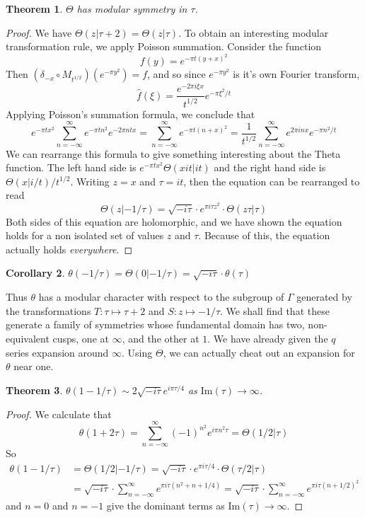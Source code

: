 \documentclass{article}
\theoremstyle{plain}
\newtheorem{theorem}{Theorem}
\newtheorem{corollary}[theorem]{Corollary}
\theoremstyle{remark}
\theoremstyle{definition}
\begin{document}
\begin{theorem}
    $\Theta$ has modular symmetry in $\tau$.
\end{theorem}
\begin{proof}
    We have $\Theta(z|\tau + 2) = \Theta(z|\tau)$. To obtain an interesting modular transformation rule, we apply Poisson summation. Consider the function
%
\[ f(y) = e^{- \pi t(y + x)^2} \]
%
Then $(\delta_{-x} \circ M_{t^{1/2}})(e^{- \pi y^2}) = f$, and so since $e^{- \pi y^2}$ is it's own Fourier transform,
%
\[ \widehat{f}(\xi) = \frac{e^{- 2 \pi i \xi x}}{t^{1/2}} e^{- \pi \xi^2/t} \]
%
Applying Poisson's summation formula, we conclude that
%
\[ e^{- \pi t x^2} \sum_{n = -\infty}^\infty e^{- \pi t n^2} e^{- 2 \pi n t x} = \sum_{n = -\infty}^\infty e^{- \pi t(n + x)^2} = \frac{1}{t^{1/2}} \sum_{n = -\infty}^\infty e^{2 \pi i n x} e^{-\pi n^2/t} \]
%
We can rearrange this formula to give something interesting about the Theta function. The left hand side is $e^{- \pi t x^2} \Theta(xit|it)$ and the right hand side is $\Theta(x|i/t)/t^{1/2}$. Writing $z = x$ and $\tau = it$, then the equation can be rearranged to read
%
\[ \Theta(z|-1/\tau) = \sqrt{-i\tau} \cdot e^{\pi i \tau z^2} \cdot \Theta(z \tau | \tau) \]
%
Both sides of this equation are holomorphic, and we have shown the equation holds for a non isolated set of values $z$ and $\tau$. Because of this, the equation actually holds {\it everywhere}.
\end{proof}

\begin{corollary} $\theta(-1/\tau) = \Theta(0|-1/\tau) = \sqrt{-i\tau} \cdot \theta(\tau)$
\end{corollary}

Thus $\theta$ has a modular character with respect to the subgroup of $\Gamma$ generated by the transformations $T: \tau \mapsto \tau + 2$ and $S: z \mapsto -1/\tau$. We shall find that these generate a family of symmetries whose fundamental domain has two, non-equivalent cusps, one at $\infty$, and the other at $1$. We have already given the $q$ series expansion around $\infty$. Using $\Theta$, we can actually cheat out an expansion for $\theta$ near one.

\begin{theorem} $\theta(1 - 1/\tau) \sim 2 \sqrt{-i\tau} e^{i \pi \tau/4}$ as $\text{Im}(\tau) \to \infty$.
\end{theorem}
\begin{proof}
We calculate that
%
\[ \theta(1 + 2 \tau) = \sum_{n = -\infty}^\infty (-1)^{n^2} e^{i \pi n^2 \tau} = \Theta(1/2|\tau) \]
%
So
%
\begin{align*}
    \theta(1 - 1/\tau) &= \Theta(1/2|-1/\tau) = \sqrt{-i\tau} \cdot e^{\pi i \tau/4} \cdot \Theta(\tau/2 | \tau)\\
    &= \sqrt{-i\tau} \cdot \sum_{n = -\infty}^\infty e^{\pi i \tau(n^2 + n + 1/4)} = \sqrt{-i\tau} \cdot \sum_{n = -\infty}^\infty e^{\pi i \tau(n + 1/2)^2}
\end{align*}
%
and $n = 0$ and $n = -1$ give the dominant terms as $\text{Im}(\tau) \to \infty$.
\end{proof}
\end{document}
